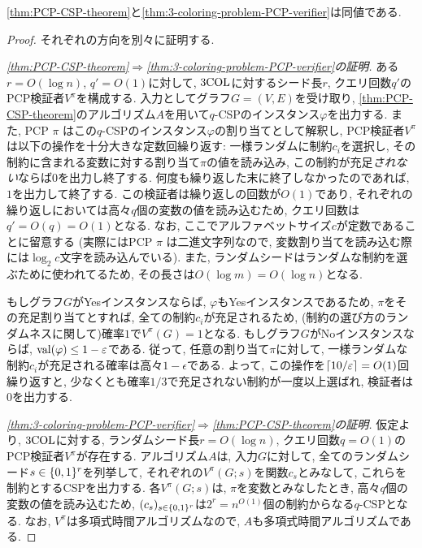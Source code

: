 \begin{lemma}{}{}
  \cref{thm:PCP-CSP-theorem}と\cref{thm:3-coloring-problem-PCP-verifier}は同値である.
\end{lemma}
\begin{proof}
  それぞれの方向を別々に証明する.

  \emph{\cref{thm:PCP-CSP-theorem}$\Rightarrow$\cref{thm:3-coloring-problem-PCP-verifier}の証明.}
  ある$r=O(\log n)$, $q'=O(1)$に対して, $\mathrm{3COL}$に対するシード長$r$, クエリ回数$q'$のPCP検証者$V^\pi$を構成する.
  入力としてグラフ$G=(V,E)$を受け取り, \cref{thm:PCP-CSP-theorem}のアルゴリズム$A$を用いて$q$-CSPのインスタンス$\varphi$を出力する.
  また, PCP $\pi$ はこの$q$-CSPのインスタンス$\varphi$の割り当てとして解釈し,
  PCP検証者$V^\pi$は以下の操作を十分大きな定数回繰り返す: 一様ランダムに制約$c_i$を選択し, その制約に含まれる変数に対する割り当て$\pi$の値を読み込み, この制約が充足\emph{されない}ならば$0$を出力し終了する. 何度も繰り返した末に終了しなかったのであれば, $1$を出力して終了する.
  この検証者は繰り返しの回数が$O(1)$であり, それぞれの繰り返しにおいては高々$q$個の変数の値を読み込むため, クエリ回数は$q'=O(q)=O(1)$となる. なお, ここでアルファベットサイズ$c$が定数であることに留意する (実際にはPCP $\pi$ は二進文字列なので, 変数割り当てを読み込む際には$\log_2 c$文字を読み込んでいる).
  また, ランダムシードはランダムな制約を選ぶために使われてるため, その長さは$O(\log m)=O(\log n)$となる.

  もしグラフ$G$がYesインスタンスならば, $\varphi$もYesインスタンスであるため, $\pi$をその充足割り当てとすれば, 全ての制約$c_i$が充足されるため, (制約の選び方のランダムネスに関して)確率$1$で$V^\pi(G)=1$となる.
  もしグラフ$G$がNoインスタンスならば, $\mathrm{val}(\varphi) \le 1-\varepsilon$である. 従って, 任意の割り当て$\pi$に対して, 一様ランダムな制約$c_i$が充足される確率は高々$1-\epsilon$である.
  よって, この操作を$\lceil10/\varepsilon\rceil=O(1)$回繰り返すと, 少なくとも確率$1/3$で充足されない制約が一度以上選ばれ, 検証者は$0$を出力する.


  \emph{\cref{thm:3-coloring-problem-PCP-verifier}$\Rightarrow$\cref{thm:PCP-CSP-theorem}の証明.}
  仮定より, $\mathrm{3COL}$に対する, ランダムシード長$r=O(\log n)$, クエリ回数$q=O(1)$のPCP検証者$V^\pi$が存在する. アルゴリズム$A$は, 入力$G$に対して, 全てのランダムシード$s\in \{0,1\}^r$を列挙して, それぞれの$V^\pi(G;s)$を関数$c_s$とみなして, これらを制約とするCSPを出力する. 各$V^\pi(G;s)$は, $\pi$を変数とみなしたとき, 高々$q$個の変数の値を読み込むため, $(c_s)_{s\in\{0,1\}^r}$は$2^r=n^{O(1)}$個の制約からなる$q$-CSPとなる.
  なお, $V^\pi$は多項式時間アルゴリズムなので, $A$も多項式時間アルゴリズムである.
\end{proof}

